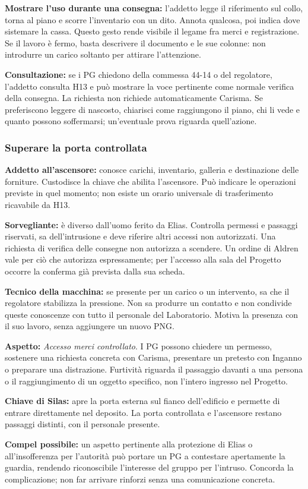\documentclass[11pt,a4paper]{article}
\newcommand{\aspect}[1]{\textit{\textcolor{blood}{#1}}}
\begin{document}
\textbf{Mostrare l'uso durante una consegna:} l'addetto legge il riferimento sul collo, torna al piano e scorre l'inventario con un dito. Annota qualcosa, poi indica dove sistemare la cassa. Questo gesto rende visibile il legame fra merci e registrazione. Se il lavoro è fermo, basta descrivere il documento e le sue colonne: non introdurre un carico soltanto per attirare l'attenzione.

\textbf{Consultazione:} se i PG chiedono della commessa 44-14 o del regolatore, l'addetto consulta H13 e può mostrare la voce pertinente come normale verifica della consegna. La richiesta non richiede automaticamente Carisma. Se preferiscono leggere di nascosto, chiarisci come raggiungono il piano, chi li vede e quanto possono soffermarsi; un'eventuale prova riguarda quell'azione.

\subsubsection{Superare la porta controllata}
\textbf{Addetto all'ascensore:} conosce carichi, inventario, galleria e destinazione delle forniture. Custodisce la chiave che abilita l'ascensore. Può indicare le operazioni previste in quel momento; non esiste un orario universale di trasferimento ricavabile da H13.

\textbf{Sorvegliante:} è diverso dall'uomo ferito da Elias. Controlla permessi e passaggi riservati, sa dell'intrusione e deve riferire altri accessi non autorizzati. Una richiesta di verifica delle consegne non autorizza a scendere. Un ordine di Aldren vale per ciò che autorizza espressamente; per l'accesso alla sala del Progetto occorre la conferma già prevista dalla sua scheda.

\textbf{Tecnico della macchina:} se presente per un carico o un intervento, sa che il regolatore stabilizza la pressione. Non sa produrre un contatto e non condivide queste conoscenze con tutto il personale del Laboratorio. Motiva la presenza con il suo lavoro, senza aggiungere un nuovo PNG.

\begin{fatebox}
\textbf{Aspetto:} \aspect{Accesso merci controllato}. I PG possono chiedere un permesso, sostenere una richiesta concreta con Carisma, presentare un pretesto con Inganno o preparare una distrazione. Furtività riguarda il passaggio davanti a una persona o il raggiungimento di un oggetto specifico, non l'intero ingresso nel Progetto.

\textbf{Chiave di Silas:} apre la porta esterna sul fianco dell'edificio e permette di entrare direttamente nel deposito. La porta controllata e l'ascensore restano passaggi distinti, con il personale presente.

\textbf{Compel possibile:} un aspetto pertinente alla protezione di Elias o all'insofferenza per l'autorità può portare un PG a contestare apertamente la guardia, rendendo riconoscibile l'interesse del gruppo per l'intruso. Concorda la complicazione; non far arrivare rinforzi senza una comunicazione concreta.
\end{fatebox}
\end{document}
